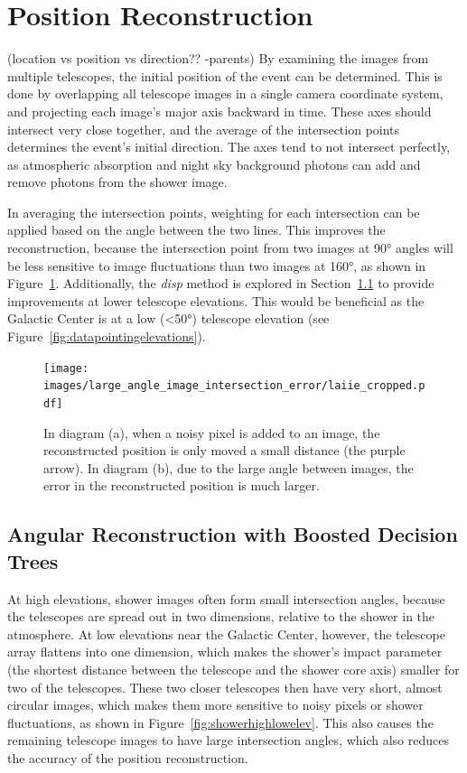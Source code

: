 \section{Position Reconstruction}\label{subsec:posrecon}
{\color{red}(location vs position vs direction?? -parents)}
By examining the images from multiple telescopes, the initial position of the event can be determined.
This is done by overlapping all telescope images in a single camera coordinate system, and projecting each image's major axis backward in time.
These axes should intersect very close together, and the average of the intersection points determines the event's initial direction.
The axes tend to not intersect perfectly, as atmospheric absorption and night sky background photons can add and remove photons from the shower image.

In averaging the intersection points, weighting for each intersection can be applied based on the angle between the two lines.
This improves the reconstruction, because the intersection point from two images at \ang{90} angles will be less sensitive to image fluctuations than two images at \ang{160}, as shown in Figure~\ref{fig:largeintersectangle}.
Additionally, the \textit{disp} method is explored in Section~\ref{subsec:disp} to provide improvements at lower telescope elevations.
This would be beneficial as the Galactic Center is at a low (<\ang{50}) telescope elevation (see Figure~\ref{fig:datapointingelevations}).

\begin{figure}[!t]
  \centering
  \texttt{[image: images/large\_angle\_image\_intersection\_error/laiie\_cropped.pdf]}
  \caption[Large Image Intersection Angles]{
    In diagram (a), when a noisy pixel is added to an image, the reconstructed position is only moved a small distance (the purple arrow).
    In diagram (b), due to the large angle between images, the error in the reconstructed position is much larger.
  }
  \label{fig:largeintersectangle}
\end{figure}
\FloatBarrier

\subsection{Angular Reconstruction with Boosted Decision Trees}\label{subsec:disp}
At high elevations, shower images often form small intersection angles, because the telescopes are spread out in two dimensions, relative to the shower in the atmosphere.
At low elevations near the Galactic Center, however, the telescope array flattens into one dimension, which makes the shower's impact parameter (the shortest distance between the telescope and the shower core axis) smaller for two of the telescopes.
These two closer telescopes then have very short, almost circular images, which makes them more sensitive to noisy pixels or shower fluctuations, as shown in Figure~\ref{fig:showerhighlowelev}.
This also causes the remaining telescope images to have large intersection angles, which also reduces the accuracy of the position reconstruction.

